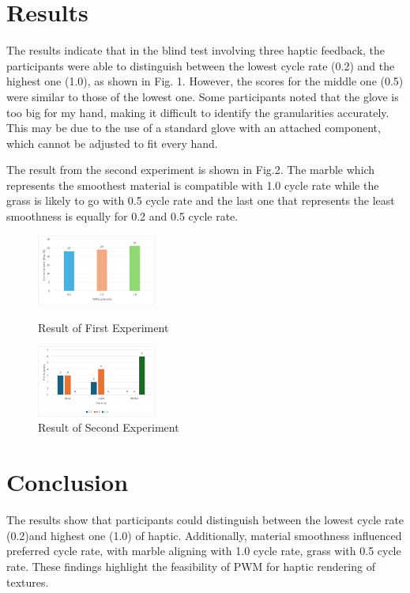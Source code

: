 \documentclass[a4paper,twocolumn]{article}
\begin{document}
\section{Results}
The results indicate that in the blind test involving three haptic feedback, the  participants were able to distinguish between the lowest cycle rate (0.2) and the highest one (1.0), as shown in Fig. 1. However, the scores for the middle one (0.5) were similar to those of the lowest one. Some participants noted that the glove is too big for my hand, making it difficult to identify the granularities accurately. This may be due to the use of a standard glove with an attached component, which cannot be adjusted to fit every hand.\par
The result from the second experiment is shown in Fig.2. The marble which represents the smoothest material is compatible with 1.0 cycle rate while the grass is likely to go with 0.5 cycle rate and the last one that represents the least smoothness is equally for 0.2 and 0.5 cycle rate.

\begin{figure}[h]
  \centering
  \includegraphics[width=0.35\textwidth]{./Fig/PWM_Correct_Test.png}
  \caption{{Result of First Experiment}}
  \label{fig1}
  \vspace{0.1cm}
  \centering
  \includegraphics[width=0.35\textwidth]{./Fig/Texture_Select_Test.png}
  \caption{{Result of Second Experiment}}
  \label{fig2}
\end{figure}


\section{Conclusion}
The results show that participants could distinguish between the lowest cycle rate (0.2)and highest one (1.0) of haptic. Additionally, material smoothness influenced preferred cycle rate, with marble aligning with 1.0 cycle rate, grass with 0.5 cycle rate. These findings highlight the feasibility of PWM for haptic rendering of textures.
\end{document}
